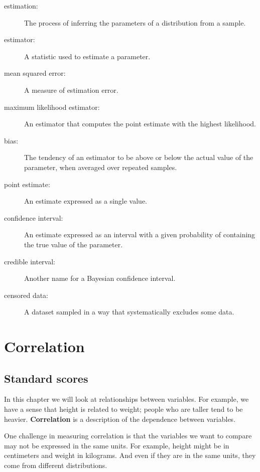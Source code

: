 \documentclass[12pt]{book}
\begin{document}
\begin{description}

\item[estimation:] The process of inferring the parameters of a distribution
from a sample.

\item[estimator:] A statistic used to estimate a parameter.

\item[mean squared error:] A measure of estimation error.

\item[maximum likelihood estimator:] An estimator that computes the
point estimate with the highest likelihood.

\item[bias:] The tendency of an estimator to be above or below the actual
value of the parameter, when averaged over repeated samples.

\item[point estimate:] An estimate expressed as a single value.

\item[confidence interval:] An estimate expressed as an interval with a
given probability of containing the true value of the parameter.

\item[credible interval:] Another name for a Bayesian confidence interval.

\item[censored data:] A dataset sampled in a way that systematically
excludes some data.

\end{description}


\chapter{Correlation}

\section{Standard scores}

In this chapter we will look at relationships between variables.  For
example, we have a sense that height is related to weight; people who
are taller tend to be heavier.  {\bf Correlation} is a description of
the dependence between variables.

One challenge in measuring correlation is that the variables we want
to compare may not be expressed in the same units.  For example, height
might be in centimeters and weight in kilograms.  And even if they are
in the same units, they come from different distributions.
\end{document}

